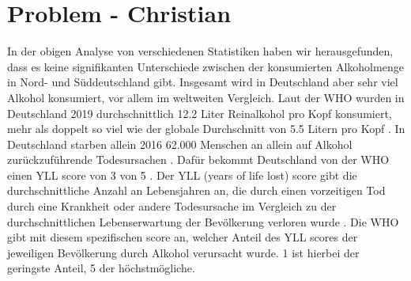 \documentclass[12pt]{article}
\begin{document}
\section{Problem \footnotesize{- Christian}}
In der obigen Analyse von verschiedenen Statistiken haben wir herausgefunden, dass es keine signifikanten Unterschiede zwischen der konsumierten Alkoholmenge in Nord- und Süddeutschland gibt. Insgesamt wird in Deutschland aber sehr viel Alkohol konsumiert, vor allem im weltweiten Vergleich. Laut der WHO wurden in Deutschland 2019 durchschnittlich 12.2 Liter Reinalkohol pro Kopf konsumiert, mehr als doppelt so viel wie der globale Durchschnitt von 5.5 Litern pro Kopf \autocite{noauthor_alcohol_nodate-1}. In Deutschland starben allein 2016 62.000 Menschen an allein auf Alkohol zurückzuführende Todesursachen \autocite{noauthor_alkoholkonsum_nodate}. Dafür bekommt Deutschland von der WHO einen YLL score von 3 von 5 \autocite{noauthor_alcohol-attributable_nodate}. Der YLL (years of life lost) score gibt die durchschnittliche Anzahl an Lebensjahren an, die durch einen vorzeitigen Tod durch eine Krankheit oder andere Todesursache im Vergleich zu der durchschnittlichen Lebenserwartung der Bevölkerung verloren wurde \autocite[1368]{martinez_reflection_2019}. Die WHO gibt mit diesem spezifischen score an, welcher Anteil des YLL scores der jeweiligen Bevölkerung durch Alkohol verursacht wurde. 1 ist hierbei der geringste Anteil, 5 der höchstmögliche.\\
\end{document}
